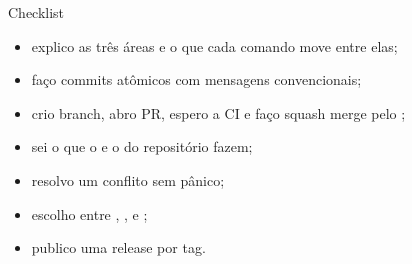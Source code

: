 \begin{frame}{Checklist}
  \begin{seisei}
    \begin{itemize}
      \small
      \item explico as três áreas e o que cada comando move entre elas;
      \item faço commits atômicos com mensagens convencionais;
      \item crio branch, abro PR, espero a CI e faço squash merge pelo ;
      \item sei o que o  e o  do repositório fazem;
      \item resolvo um conflito sem pânico;
      \item escolho entre , ,  e ;
      \item publico uma release por tag.
    \end{itemize}
  \end{seisei}
\end{frame}

